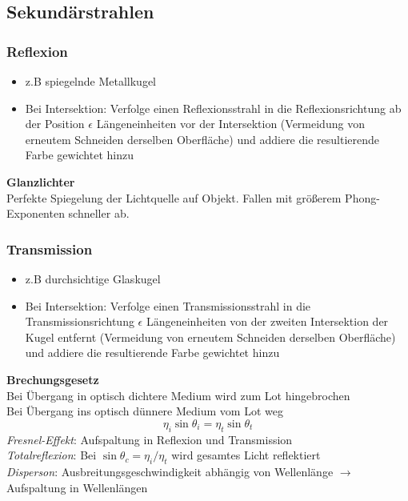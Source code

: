 \documentclass[10pt,a4paper]{article}
\begin{document}
	\subsection{Sekundärstrahlen}
	\label{rt:sub:sekundaerstrahlen}
	
	\subsubsection{Reflexion}
        \begin{itemize}
        \item z.B spiegelnde Metallkugel
        \item Bei Intersektion: Verfolge einen Reflexionsstrahl in die Reflexionsrichtung ab der Position $\epsilon$ Längeneinheiten vor der Intersektion (Vermeidung von erneutem Schneiden derselben Oberfläche) und addiere die resultierende Farbe gewichtet hinzu
        \end{itemize}

        \textbf{Glanzlichter}\\
        Perfekte Spiegelung der Lichtquelle auf Objekt. Fallen mit größerem Phong-Exponenten schneller ab.

        \subsubsection{Transmission}
        \begin{itemize}
        \item z.B durchsichtige Glaskugel
        \item Bei Intersektion: Verfolge einen Transmissionsstrahl in die Transmissionsrichtung $\epsilon$ Längeneinheiten von der zweiten Intersektion der Kugel entfernt (Vermeidung von erneutem Schneiden derselben Oberfläche) und addiere die resultierende Farbe gewichtet hinzu
        \end{itemize}
        \textbf{Brechungsgesetz}\\
        Bei Übergang in optisch dichtere Medium wird zum Lot hingebrochen\\
        Bei Übergang ins optisch dünnere Medium vom Lot weg\\
        \[\eta_i \sin \theta_i = \eta_t \sin \theta_t\]
        \textit{Fresnel-Effekt}: Aufspaltung in Reflexion und Transmission\\
        \textit{Totalreflexion}: Bei \(\sin \theta_c = \eta_i / \eta_t\) wird gesamtes Licht reflektiert\\
        \textit{Disperson}: Ausbreitungsgeschwindigkeit abhängig von Wellenlänge \(\rightarrow\) Aufspaltung in Wellenlängen
        
\end{document}
